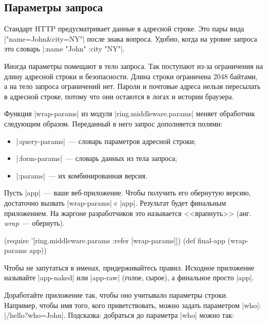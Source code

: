 \subsection{Параметры запроса}

\label{ring-params}

Стандарт HTTP предусматривает данные в адресной строке. Это пары вида
\spverb|"name=John&city=NY"| после знака вопроса. Удобно, когда на уровне
запроса это словарь \spverb|{:name "John" :city "NY"}|.

Иногда параметры помещают в тело запроса. Так поступают из-за ограничения на
длину адресной строки и безопасности. Длина строки ограничена 2048 байтами, а на
тело запроса ограничений нет. Пароли и почтовые адреса нельзя пересылать в
адресной строке, потому что они остаются в логах и истории браузера.

Функция \spverb|wrap-params| из модуля \spverb|ring.middleware.params| меняет
обработчик следующим образом. Переданный в него запрос дополняется полями:

\begin{itemize}

\item
  \spverb|:query-params|~--- словарь параметров адресной строки;

\item
  \spverb|:form-params|~--- словарь данных из тела запроса;

\item
  \spverb|:params|~--- их комбинированная версия.

\end{itemize}

Пусть \spverb|app|~--- ваше веб-приложение. Чтобы получить его обернутую версию,
достаточно вызвать \spverb|wrap-params| c \spverb|app|. Результат будет
финальным приложением. На жаргоне разработчиков это называется <<врапнуть>>
(анг. \emph{wrap}~--- обернуть).

\begin{english}
  \begin{clojure}
(require '[ring.middleware.params :refer [wrap-params]])
(def final-app (wrap-params app))
  \end{clojure}
\end{english}

Чтобы не запутаться в именах, придерживайтесь правил. Исходное приложение
называйте \spverb|app-naked| или \spverb|app-raw| (голое, сырое), а финальное
просто \spverb|app|.

Доработайте приложение так, чтобы оно учитывало параметры строки. Например,
чтобы имя того, кого приветствовать, можно задать параметром \spverb|who|:
\spverb|/hello?who=John|. Подсказка: добраться до параметра \spverb|who| можно
так:

